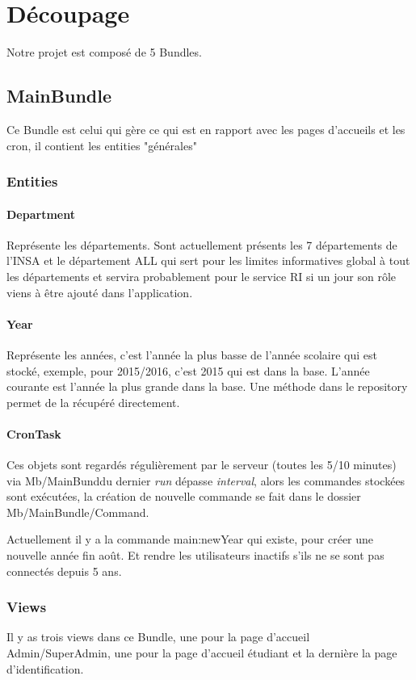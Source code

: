 \chapter{Découpage}
Notre projet est composé de 5 Bundles.

\section{MainBundle}
Ce Bundle est celui qui gère ce qui est en rapport avec les pages d'accueils et les cron, il contient les entities "générales"

\subsection{Entities}
\subsubsection{Department}
Représente les départements. Sont actuellement présents les 7 départements de l'INSA et le département ALL qui sert pour les limites informatives global à tout les départements et servira probablement pour le service RI si un jour son rôle viens à être ajouté dans l'application.

\subsubsection{Year}
Représente les années, c'est l'année la plus basse de l'année scolaire qui est stocké, exemple, pour 2015/2016, c'est 2015 qui est dans la base. L'année courante est l'année la plus grande dans la base. Une méthode dans le repository permet de la récupéré directement.

\subsubsection{CronTask}
Ces objets sont regardés régulièrement par le serveur (toutes les 5/10 minutes) via Mb/MainBunddu dernier \textit{run} dépasse \textit{interval}, alors les commandes stockées sont exécutées, la création de nouvelle commande se fait dans le dossier Mb/MainBundle/Command. 

Actuellement il y a la commande main:newYear qui existe, pour créer une nouvelle année fin août. Et rendre les utilisateurs inactifs s'ils ne se sont pas connectés depuis 5 ans.


\subsection{Views}
Il y as trois views dans ce Bundle, une pour la page d'accueil Admin/SuperAdmin, une pour la page d'accueil étudiant et la dernière la page d'identification.

